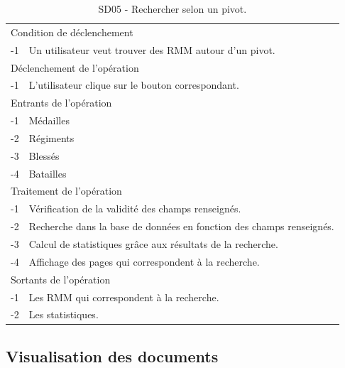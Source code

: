 \documentclass[a4paper]{article}
\begin{document}
\begin{table}[H]
  \centering
   \small
	\begin{tabular}{|c|p{12cm}|}
   		\hline
   			\rowcolor{lightgray}\multicolumn{2}{|c|}{\textbf{SD05 - Rechercher selon un pivot.}} \\
   		\hline
   			\multicolumn{2}{|l|}{Condition de d\'eclenchement} \\
   		\hline
   			-1 & Un utilisateur veut trouver des RMM autour d'un pivot. \\
   		\hline
   			\multicolumn{2}{|l|}{D\'eclenchement de l'op\'eration} \\
   		\hline
   			-1 & L'utilisateur clique sur le bouton correspondant. \\
   		\hline
   			\multicolumn{2}{|l|}{Entrants de l'op\'eration} \\
   		\hline
   			-1 & Médailles \\
            -2 & Régiments \\
            -3 & Blessés \\
            -4 & Batailles \\
   		\hline
   			\multicolumn{2}{|l|}{Traitement de l'op\'eration} \\
  		\hline
  			-1 & Vérification de la validité des champs renseignés. \\
   			-2 & Recherche dans la base de données en fonction des champs renseignés. \\
            -3 & Calcul de statistiques grâce aux résultats de la recherche. \\
        	-4 & Affichage des pages qui correspondent à la recherche. \\
   		\hline
   			\multicolumn{2}{|l|}{Sortants de l'op\'eration} \\
   		\hline
   			-1 & Les RMM qui correspondent à la recherche. \\
            -2 & Les statistiques. \\
   		\hline
	\end{tabular}
  \caption{SD05 - Rechercher selon un pivot.}
  \normalsize
  \label{tab:SD05}
\end{table}

\subsection{Visualisation des documents}
\end{document}
